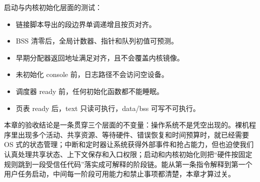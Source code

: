 启动与内核初始化层面的测试：

\begin{itemize}
\tightlist
\item 链接脚本导出的段边界单调递增且按页对齐。
\item BSS 清零后，全局计数器、指针和队列初值可预测。
\item 早期分配器返回地址满足对齐，且不会覆盖内核镜像。
\item 未初始化 console 前，日志路径不会访问空设备。
\item 调度器 ready 前，任何初始化函数都不能睡眠。
\item 页表 ready 后，text 只读可执行，data/bss 可写不可执行。
\end{itemize}

\begin{keyidea}
本章的验收结论是一条贯穿三个层面的不变量：操作系统不是凭空出现的。裸机程序里出现多个活动、共享资源、等待硬件、错误恢复和时间预算时，就已经需要 OS 式的状态管理；中断和定时器让系统获得外部事件和抢占能力，但也迫使我们认真处理共享状态、上下文保存和入口权限；启动和内核初始化则把“硬件按固定规则跳到一段受信任代码”落实成可解释的阶段链。能从第一条指令解释到第一个用户任务启动，中间每一阶段可用能力和禁止事项都清楚，本章才算过关。
\end{keyidea}
